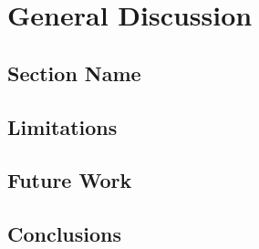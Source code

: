 \chapter{General Discussion} \label{chap:discussion}

\section{Section Name}

\section{Limitations}

\section{Future Work}

\section{Conclusions}
